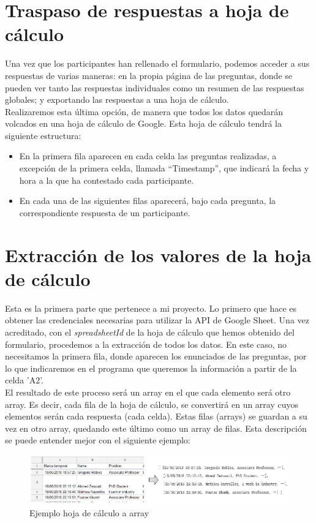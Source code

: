 \documentclass[a4paper, 12pt]{book}
\begin{document}
\section{Traspaso de respuestas a hoja de cálculo}
\label{sec:pasaraExcel}
Una vez que los participantes han rellenado el formulario, podemos acceder a sus respuestas de varias maneras: en la propia página de las preguntas, donde se pueden ver tanto las respuestas individuales como un resumen de las respuestas globales; y exportando las respuestas a una hoja de cálculo.\\

Realizaremos esta última opción, de manera que todos los datos quedarán volcados en una hoja de cálculo de Google. Esta hoja de cálculo tendrá la siguiente estructura:
\begin{itemize}
	\item En la primera fila aparecen en cada celda las preguntas realizadas, a excepción de la primera celda, llamada ``Timestamp'', que indicará la fecha y hora a la que ha contestado cada participante.
	\item En cada una de las siguientes filas aparecerá, bajo cada pregunta, la correspondiente respuesta de un participante.
\end{itemize}


\section{Extracción de los valores de la hoja de cálculo}
\label{sec:extraerExcel}
Esta es la primera parte que pertenece a mi proyecto. Lo primero que hace es obtener las credenciales necesarias para utilizar la API de Google Sheet. Una vez acreditado, con el \mbox{\textit{spreadsheetId}} de la hoja de cálculo que hemos obtenido del formulario, procedemos a la extracción de todos los datos. En este caso, no necesitamos la primera fila, donde aparecen los enunciados de las preguntas, por lo que indicaremos en el programa que queremos la información a partir de la celda 'A2'.\\

El resultado de este proceso será un array en el que cada elemento será otro array. Es decir, cada fila de la hoja de cálculo, se convertirá en un array cuyos elementos serán cada respuesta (cada celda). Estas filas (arrays) se guardan a su vez en otro array, quedando este último como un array de filas. Esta descripción se puede entender mejor con el siguiente ejemplo:

\begin{figure}[h!]
	\centering
	\includegraphics[width=17cm, keepaspectratio]{img/ejemplo45real}
	\caption{Ejemplo hoja de cálculo a array}
	\label{fig:ejemplo4_5}
\end{figure}
\end{document}
